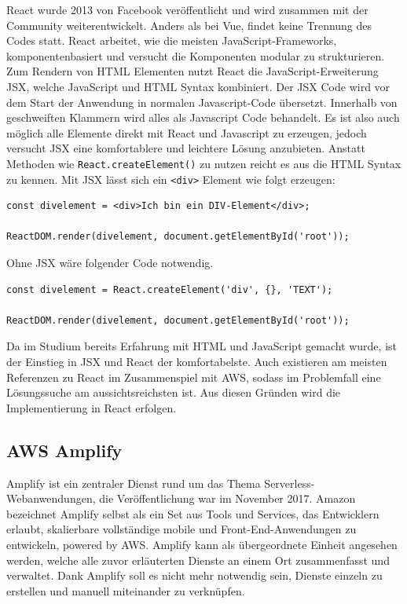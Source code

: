 {React wurde 2013 von Facebook veröffentlicht und wird zusammen mit der Community weiterentwickelt.
Anders als bei Vue, findet keine Trennung des Codes statt.
React arbeitet, wie die meisten JavaScript-Frameworks, komponentenbasiert und versucht die Komponenten modular zu strukturieren.
Zum Rendern von HTML Elementen nutzt React die JavaScript-Erweiterung JSX, welche JavaScript und HTML Syntax kombiniert.
Der JSX Code wird vor dem Start der Anwendung in normalen Javascript-Code übersetzt.
Innerhalb von geschweiften Klammern wird alles als Javascript Code behandelt.
Es ist also auch möglich alle Elemente direkt mit React und Javascript zu erzeugen, jedoch versucht JSX eine komfortablere und leichtere Lösung anzubieten.
Anstatt Methoden wie \verb+React.createElement()+ zu nutzen reicht es aus die HTML Syntax zu kennen.
Mit JSX lässt sich ein \verb+<div>+ Element wie folgt erzeugen:
\begin{lstlisting}[basicstyle=\ttfamily, breaklines=true , frame = single, backgroundcolor=\color{flashwhite} ]
const divelement = <div>Ich bin ein DIV-Element</div>;

ReactDOM.render(divelement, document.getElementById('root'));
\end{lstlisting}

Ohne JSX wäre folgender Code notwendig.\cite{JSX}
\begin{lstlisting}[basicstyle=\ttfamily, breaklines=true , frame = single, backgroundcolor=\color{flashwhite} ]
const divelement = React.createElement('div', {}, 'TEXT');

ReactDOM.render(divelement, document.getElementById('root'));
\end{lstlisting}


Da im Studium bereits Erfahrung mit HTML und JavaScript gemacht wurde, ist der Einstieg in JSX und React der komfortabelste.
Auch existieren am meisten Referenzen zu React im Zusammenspiel mit AWS, sodass im Problemfall eine Lösungssuche am aussichtsreichsten ist.
Aus diesen Gründen wird die Implementierung in React erfolgen.


\subsection{AWS Amplify}
\label{Amplify}

Amplify ist ein zentraler Dienst rund um das Thema Serverless-Webanwendungen, die Veröffentlichung war im November 2017.
Amazon bezeichnet Amplify selbst als {}\glqq ein Set aus Tools und Services, das Entwicklern erlaubt, skalierbare vollständige
mobile und Front-End-Anwendungen zu entwickeln, powered by AWS.\grqq{}\cite{AWSAmplify}
Amplify kann als übergeordnete Einheit angesehen werden, welche alle zuvor erläuterten Dienste an einem Ort zusammenfasst und verwaltet.
Dank Amplify soll es nicht mehr notwendig sein, Dienste einzeln zu erstellen und manuell miteinander zu verknüpfen.

}
